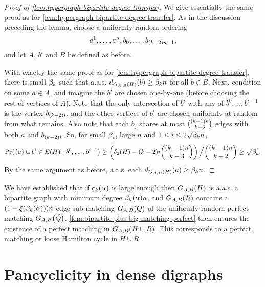 \documentclass[11pt,english]{article}
\theoremstyle{plain}
\theoremstyle{definition}
\theoremstyle{definition}
\theoremstyle{plain}
\theoremstyle{plain}
\theoremstyle{plain}
\theoremstyle{plain}
\theoremstyle{remark}
\theoremstyle{remark}
\let\originalleft\left
\let\originalright\right
\renewcommand{\left}{\mathopen{}\mathclose\bgroup\originalleft}
\renewcommand{\right}{\aftergroup\egroup\originalright}
\begin{document}
\begin{proof}
[Proof of \ref{lem:hypergraph-bipartite-degree-transfer}]We give
essentially the same proof as for \ref{lem:hypergraph-bipartite-degree-transfer}. As in the discussion preceding the lemma, choose a uniformly random ordering
\[
a^{1},\dots,a^{n},b_{0},\dots,b_{\left(k-2\right)n-1},
\]
and let $A$, $b^i$ and $B$ be defined as before.

With exactly the same proof as for \ref{lem:hypergraph-bipartite-degree-transfer},
there is small $\beta_k$ such that a.a.s. $d_{G_{A,B}\left(H\right)}\left(b\right)\ge\aham n$
for all $b\in B$. Next, condition on some $a\in A$, and imagine the $b^i$ are chosen one-by-one
(before choosing the rest of vertices of $A$). Note  that the only intersection of $b^i$ with any of $b^0,\dots,b^{i-1}$ is the vertex $b_{\left(k-2\right)i}$, and the other vertices of $b^i$ are chosen uniformly at random from what remains. Also note that each $b_j$ shares at most ${\left(k-1\right)n \choose k-3}$ edges with both $a$ and $b_{\left(k-2\right)i}$. So, for small $\beta_k$, large $n$
and $1\le i\le2\sqrt{\beta_k}n$,
\[
\Pr\left(\left\{ a\right\} \cup b^{i}\in E\left(H\right)\mid b^{0},\dots,b^{i-1}\right)\ge\left(\delta_{2}\left(H\right)-\left(k-2\right)i{\left(k-1\right)n \choose k-3}\right)\left.\vphantom{\sum}\right/{ \left(k-1\right)n \choose k-2}\ge\sqrt{\aham}.
\]
By the same argument as before, a.a.s. each $d_{G_{A,B}\left(H\right)}\left(a\right)\ge\aham n$.
\end{proof}
We have established that if $\chyp\left(\alpha\right)$ 
is large enough then $G_{A,B}\left(H\right)$ is a.a.s. a bipartite graph with minimum degree $\a\left(\alpha\right)n$, and $G_{A,B}\left(R\right)$ contains a $\left(1-\xi\left(\a\left(\alpha\right)\right)\right)n$-edge sub-matching $G_{A,B}\left(Q\right)$ of the uniformly random perfect matching $G_{A,B}\left(\bar{Q}\right)$. \ref{lem:bipartite-plus-big-matching-perfect} then
ensures the existence of a perfect matching in $G_{A,B}\left(H\cup R\right)$. This corresponds to a perfect matching or loose Hamilton cycle in $H\cup R$.


\section{\label{sec:digraphs}Pancyclicity in dense digraphs}
\end{document}
